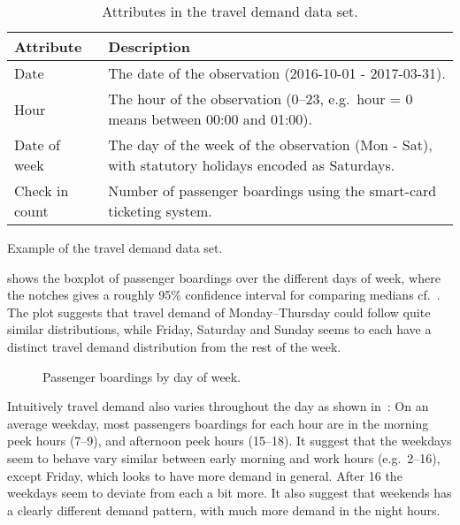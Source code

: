 \documentclass[a4paper,11pt]{article}
\begin{document}
\begin{table}[!ht]
    \center
    \begin{tabular}{p{1in}p{4in}}        
        Attribute & Description \\
        \hline 
        \hline         
        Date & The date of the observation (2016-10-01 - 2017-03-31). \\
        \hline 
        Hour & The hour of the observation (0--23, e.g.\ hour = 0 means between 00:00 and 01:00). \\
        \hline 
        Date of week & The day of the week of the observation (Mon - Sat), with statutory holidays encoded as Saturdays. \\
        \hline 
        Check in count & Number of passenger boardings using the smart-card ticketing system. \\
    \end{tabular}
    \caption{Attributes in the travel demand data set.}
    \label{tab:travel_demand_data_attr}
\end{table}

\begin{table}[!ht]
    \center
    
    \caption{Example of the travel demand data set.}
    \label{tab:travel_demand_data_example}
\end{table}


 shows the boxplot of passenger boardings over the different days of week, where the notches gives a roughly 95\% confidence interval for comparing medians cf.~\citet{Boxplots}. The plot suggests that travel demand of Monday--Thursday could follow quite similar distributions, while Friday, Saturday and Sunday seems to each have a distinct travel demand distribution from the rest of the week.

\clearpage
\begin{figure}[!ht]
    \center
    
    \caption{Passenger boardings by day of week.}
    \label{fig:travelcard_boxplot}
\end{figure}

Intuitively travel demand also varies throughout the day as shown in~: On an average weekday, most passengers boardings for each hour are in the morning peek hours (7--9), and afternoon peek hours (15--18). It suggest that the weekdays seem to behave vary similar between early morning and work hours (e.g.\ 2--16), except Friday, which looks to have more demand in general. After 16 the weekdays seem to deviate from each a bit more. It also suggest that weekends has a clearly different demand pattern, with much more demand in the night hours.
\end{document}

